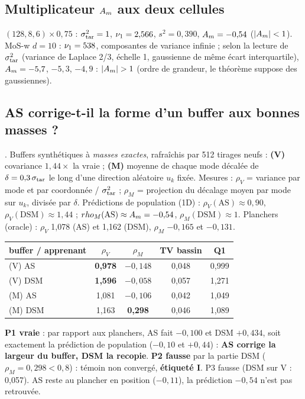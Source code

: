 \subsection{Multiplicateur $A_m$ aux deux cellules}
$(128,8,6)\times0{,}75$ : $\sigma_{\rm tar}^2=1$, $\nu_{1}=2{,}566$, $s^2=0{,}390$, $A_m=-0{,}54$ ($|A_m|<1$). MoS-w $d=10$ : $\nu_{1}=538$, composantes de variance infinie ; selon la lecture de $\sigma_{\rm tar}^2$ (variance de Laplace 2/3, échelle 1, gaussienne de même écart interquartile), $A_m=-5{,}7$, $-5{,}3$, $-4{,}9$ : $|\Am|>1$ (ordre de grandeur, le théorème suppose des gaussiennes).

\subsection{AS corrige-t-il la forme d'un buffer aux bonnes masses ?}
. Buffers synthétiques à \emph{masses exactes}, rafraîchis par 512 tirages neufs : \textbf{(V)} covariance $1{,}44\times$ la vraie ; \textbf{(M)} moyenne de chaque mode décalée de $\delta=0{,}3\,\sigma_{\rm tar}$ le long d'une direction aléatoire $u_k$ fixée. Mesures : $\rho_V$ = variance par mode et par coordonnée / $\sigma_{\rm tar}^2$ ; $\rho_M$ = projection du décalage moyen par mode sur $u_k$, divisée par $\delta$. Prédictions de population (1D) : $\rho_V(\text{AS})\approx0{,}90$, $\rho_V(\text{DSM})\approx1{,}44$ ; $rho_M(\text{AS})\approx A_m=-0{,}54$, $\rho_M(\text{DSM})\approx1$. Planchers (oracle) : $\rho_V$ 1,078 (AS) et 1,162 (DSM), $\rho_M$ $-0{,}165$ et $-0{,}131$.
\begin{table}[h]\centering\small
\begin{tabular}{lcccc}\toprule
buffer / apprenant & $\rho_V$ & $\rho_M$ & TV bassin & Q1\\\midrule
(V) AS & \textbf{0,978} & $-0{,}148$ & 0,048 & 0,999\\
(V) DSM & \textbf{1,596} & $-0{,}058$ & 0,057 & 1,271\\
(M) AS & 1,081 & \textbf{$-0{,}106$} & 0,042 & 1,049\\
(M) DSM & 1,163 & \textbf{0,298} & 0,046 & 1,089\\\bottomrule
\end{tabular}
\end{table}
\begin{verdict}\textbf{P1 vraie} : par rapport aux planchers, AS fait $-0{,}100$ et DSM $+0{,}434$, soit exactement la prédiction de population ($-0{,}10$ et $+0{,}44$) : \textbf{AS corrige la largeur du buffer, DSM la recopie}. \textbf{P2 fausse} par la partie DSM ($\rho_M=0{,}298<0{,}8$) : témoin non convergé, \textbf{étiqueté I}. P3 fausse (DSM sur V : 0,057). AS reste au plancher en position ($-0{,}11$), la prédiction $-0{,}54$ n'est pas retrouvée.\end{verdict}

